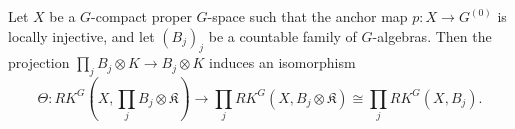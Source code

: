 \begin{lem}
Let $X$ be a $G$-compact proper $G$-space such that the anchor map $p:X\rightarrow G^{(0)}$ is locally injective, and let $(B_j)_j$ be a countable family of $G$-algebras. Then the projection $\prod_j B_j \otimes K \rightarrow B_j\otimes K$ induces an isomorphism
\[\Theta : RK^G(X,\prod_j B_j\otimes \mathfrak K)\rightarrow \prod_j RK^G(X,B_j\otimes \mathfrak K)\cong \prod_j RK^G(X,B_j).\]
\label{LocalInjectivity}
\end{lem}


